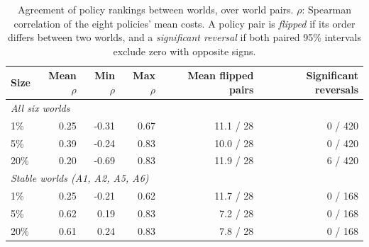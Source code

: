 \begin{table}[!htbp]
\centering\small
\caption{Agreement of policy rankings between worlds, over world pairs. $\rho$: Spearman correlation of the eight policies' mean costs. A policy pair is \emph{flipped} if its order differs between two worlds, and a \emph{significant reversal} if both paired 95\% intervals exclude zero with opposite signs.}\label{tab:rank}
\begin{tabular}{lrrrrr}
\toprule
Size & Mean $\rho$ & Min $\rho$ & Max $\rho$ & Mean flipped pairs & Significant reversals \\
\midrule
\multicolumn{6}{l}{\emph{All six worlds}} \\
1\% & 0.25 & -0.31 & 0.67 & 11.1 / 28 & 0 / 420 \\
5\% & 0.39 & -0.24 & 0.83 & 10.0 / 28 & 0 / 420 \\
20\% & 0.20 & -0.69 & 0.83 & 11.9 / 28 & 6 / 420 \\
\multicolumn{6}{l}{\emph{Stable worlds (A1, A2, A5, A6)}} \\
1\% & 0.25 & -0.21 & 0.62 & 11.7 / 28 & 0 / 168 \\
5\% & 0.62 & 0.19 & 0.83 & 7.2 / 28 & 0 / 168 \\
20\% & 0.61 & 0.24 & 0.83 & 7.8 / 28 & 0 / 168 \\
\bottomrule
\end{tabular}
\end{table}
